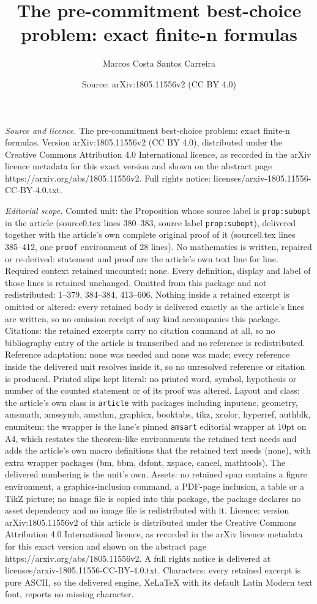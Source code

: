 \documentclass[10pt,a4paper]{amsart}
\title[The pre-commitment best-choice problem: exact finite-n formu]{The pre-commitment best-choice problem: exact finite-n formulas}
\author{Marcos Costa Santos Carreira}
\date{Source: arXiv:1805.11556v2 (CC BY 4.0)}
\begin{document}
\maketitle

\noindent\emph{Source and licence.} The pre-commitment best-choice problem: exact finite-n formulas. Version arXiv:1805.11556v2 (CC BY 4.0), distributed under the Creative Commons Attribution 4.0 International licence, as recorded in the arXiv licence metadata for this exact version and shown on the abstract page https://arxiv.org/abs/1805.11556v2. Full rights notice: licenses/arxiv-1805.11556-CC-BY-4.0.txt.\par\smallskip

\noindent\textit{Editorial scope.} Counted unit: the Proposition whose source label is \texttt{prop:subopt} in the article (source0.tex lines 380--383, source label \texttt{prop:subopt}), delivered together with the article's own complete original proof of it (source0.tex lines 385--412, one \texttt{proof} environment of 28 lines). No mathematics is written, repaired or re-derived: statement and proof are the article's own text line for line. Required context retained uncounted: none. Every definition, display and label of those lines is retained unchanged. Omitted from this package and not redistributed: 1--379, 384--384, 413--606. Nothing inside a retained excerpt is omitted or altered: every retained body is delivered exactly as the article's lines are written, so no omission receipt of any kind accompanies this package. Citations: the retained excerpts carry no citation command at all, so no bibliography entry of the article is transcribed and no reference is redistributed. Reference adaptation: none was needed and none was made; every reference inside the delivered unit resolves inside it, so no unresolved reference or citation is produced. Printed slips kept literal: no printed word, symbol, hypothesis or number of the counted statement or of its proof was altered. Layout and class: the article's own class is \texttt{article} with packages including inputenc, geometry, amsmath, amssymb, amsthm, graphicx, booktabs, tikz, xcolor, hyperref, authblk, enumitem; the wrapper is the lane's pinned \texttt{amsart} editorial wrapper at 10pt on A4, which restates the theorem-like environments the retained text needs and adds the article's own macro definitions that the retained text needs (none), with extra wrapper packages (bm, bbm, dsfont, xspace, cancel, mathtools). The delivered numbering is the unit's own. Assets: no retained span contains a figure environment, a graphics-inclusion command, a PDF-page inclusion, a table or a TikZ picture; no image file is copied into this package, the package declares no asset dependency and no image file is redistributed with it. Licence: version arXiv:1805.11556v2 of this article is distributed under the Creative Commons Attribution 4.0 International licence, as recorded in the arXiv licence metadata for this exact version and shown on the abstract page https://arxiv.org/abs/1805.11556v2. A full rights notice is delivered at licenses/arxiv-1805.11556-CC-BY-4.0.txt. Characters: every retained excerpt is pure ASCII, so the delivered engine, XeLaTeX with its default Latin Modern text font, reports no missing character.
\end{document}
